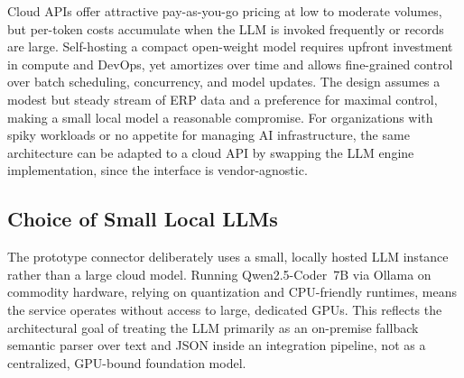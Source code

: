 \documentclass{article}
\begin{document}
Cloud APIs offer attractive pay-as-you-go pricing at low to moderate volumes, but per-token
costs accumulate when the LLM is invoked frequently or records are
large.\autocite{sitepoint2026localllm,detectx2025cost}
Self-hosting a compact open-weight model requires upfront investment in compute and DevOps, yet
amortizes over time and allows fine-grained control over batch scheduling, concurrency, and
model updates.
The design assumes a modest but steady stream of ERP data and a preference for maximal
control, making a small local model a reasonable compromise.
For organizations with spiky workloads or no appetite for managing AI infrastructure, the same
architecture can be adapted to a cloud API by swapping the LLM engine implementation, since
the interface is vendor-agnostic.




\subsection{Choice of Small Local LLMs}
The prototype connector deliberately uses a small, locally hosted LLM instance rather than a
large cloud model.
Running Qwen2.5-Coder~7B via Ollama on commodity hardware, relying on quantization and
CPU-friendly runtimes, means the service operates without access to large, dedicated
GPUs.\autocite{daily2026ollama,makiai2025qwen}
This reflects the architectural goal of treating the LLM primarily as an on-premise fallback
semantic parser over text and JSON inside an integration pipeline, not as a centralized,
GPU-bound foundation model.
\end{document}
